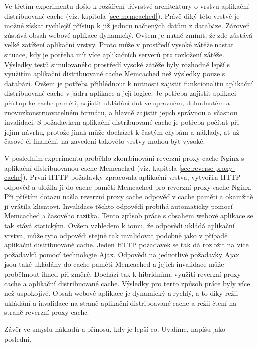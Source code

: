 \documentclass[12pt]{article}
\begin{document}
Ve třetím experimentu došlo k rozšíření třívrstvé architektury o vrstvu aplikační distribuované cache (viz. kapitola \ref{sec:memcached}). Právě diký této vrstvě je možné získat rychlejší přístup k již jednou načtených datům z databáze. Zároveň zůstává obsah webové aplikace dynamický. Ovšem je nutné zmínit, že zde zůstává velké zatížení aplikační vrstvy. Proto může v prostředí vysoké zátěže nastat situace, kdy je potřeba mít více aplikačních serverů pro rozložení zátěže. Výsledky testů simulovaného prostředí vysoké zátěže byly rozhodně lepší s využitím aplikační distribuované cache Memcached než výsledky pouze s databází. Ovšem je potřeba přihlédnout k nutnosti zajistit funkcionalitu aplikační distribuované cache v jádru aplikace a její logice. Je potřeba zajistit aplikaci přístup ke cache paměti, zajistit ukládání dat ve spravném, dohodnutém a znovuzkonstruovatelném formátu, a hlavně zajistit jejich správnou a včasnou invalidaci. S požadavkem aplikační distribuované cache je potřeba počítat při jejím návrhu, protože jinak může docházet k častým chybám a náklady, ať už časové či finanční, na zavedení takovéto vrstvy mohou být vysoké.

V posledním experimentu proběhlo zkombinování reverzní proxy cache Nginx s aplikační distribuovanou cache Memcached (viz. kapitola \ref{sec:reverse-proxy-cache}). První HTTP požadavky zpracovala aplikační vrstva, vytvořila HTTP odpověď a uložila ji do cache paměti Memcached pro reverzní proxy cache Nginx. Při příštím dotazu našla reverzní proxy cache odpověď v cache paměti a okamžitě ji vrátila klientovi. Invalidace těchto odpovědí probíhá automaticky pomocí Memcached a časového razítka. Tento způsob práce s obsahem webové aplikace se tak stává statickým. Ovšem vzhledem k tomu, že odpovědi ukládá aplikační vrstva, může tyto odpovědi stejně tak invalidovat podobně jako v případě aplikační distribuované cache. Jeden HTTP požadavek se tak dá rozložit na více požadavků pomocí technologie Ajax. Odpovědi na jednotlivé požadavky Ajax jsou také ukládány do cache paměti Memcached a jejich invalidace může proběhnout ihned při změně. Dochází tak k hibridnímu využití reverzní proxy cache a aplikační distribuované cache. Výsledky pro tento způsob práce byly více než uspokojivé. Obsah webové aplikace je dynamický a rychlý, a to díky režii ukládání a invalidace na straně aplikační distriboavané cache a režii čtení na straně reverzní proxy cache.

Závěr ve smyslu nákladů a přínosů, kdy je lepší co. Uvidíme, napíšu jako poslední.
\end{document}
